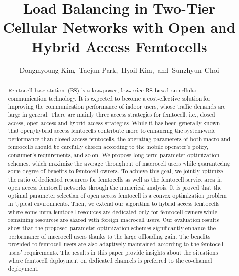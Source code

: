 \documentclass[journal]{IEEEtran}
\begin{document}
\title{Load Balancing in Two-Tier Cellular Networks with Open and Hybrid Access Femtocells}


\author{Dongmyoung Kim,~Taejun Park,~Hyoil Kim,~and~Sunghyun~Choi}



\maketitle


\begin{abstract}
Femtocell base station~(BS) is a low-power, low-price BS based on cellular communication technology. It is expected to become a cost-effective solution for improving the communication performance of indoor users, whose traffic demands are large in general.
There are mainly three access strategies for femtocell, i.e., closed access, open access and hybrid access strategies.
While it has been generally known that open/hybrid access femtocells contribute
more to enhancing the system-wide performance than closed access femtocells,
the operating parameters of both macro and femtocells should be carefully
chosen according to the mobile operator's policy, consumer's requirements, and so on.
We propose long-term parameter optimization schemes,
which maximize the average throughput of macrocell users while guaranteeing some degree of benefits to femtocell owners. To achieve this goal, we jointly optimize the ratio of dedicated resources for femtocells as well as the femtocell service area
in open access femtocell networks through the numerical analysis.
It is proved that the optimal parameter selection of open access femtocell is
a convex optimization problem in typical environments.
Then, we extend our algorithm to hybrid access femtocells where
some intra-femtocell resources are dedicated only for femtocell owners while remaining resources are shared with foreign macrocell users.
Our evaluation results show that the proposed parameter optimization
schemes significantly enhance the performance of macrocell users thanks to the large offloading gain. The benefits provided to femtocell users are also adaptively maintained according to the femtocell users' requirements.
The results in this paper
provide insights about the situations where femtocell
deployment on dedicated channels is preferred to the co-channel deployment.


\end{abstract}
\end{document}
